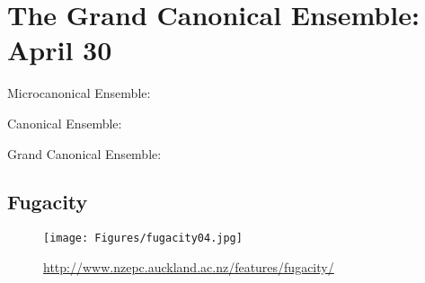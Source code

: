\section{The Grand Canonical Ensemble: April 30}
Microcanonical Ensemble:

Canonical Ensemble:

Grand Canonical Ensemble:


\subsection{Fugacity}
\label{s:Fugacity}
\begin{figure}[h]
\centering
\texttt{[image: Figures/fugacity04.jpg]}
\caption{\url{http://www.nzepc.auckland.ac.nz/features/fugacity/}}
\end{figure}
